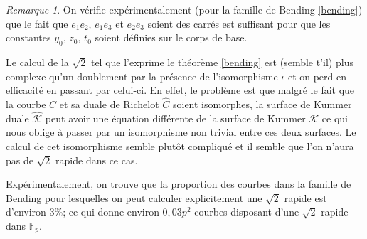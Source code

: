 \documentclass[a4paper,12pt]{article}
\newtheorem{lemme}[theoreme]{Lemme}
\newtheorem{corollaire}[theoreme]{Corollaire}
\theoremstyle{definition}
\theoremstyle{remark}
\newtheorem{remarque}{Remarque}
\numberwithin{equation}{section}
\begin{document}
%
%
%
%
%
\begin{remarque}
On vérifie expérimentalement (pour la famille de Bending \ref{bending}) que le fait que $e_1e_2$, $e_1e_3$ et $e_2e_3$ soient des carrés est suffisant pour que les constantes $y_0$, $z_0$, $t_0$ soient définies sur le corps de base.
\end{remarque}

Le calcul de la $\sqrt{2}$ tel que l'exprime le théorème \ref{bending} est (semble t'il) plus complexe qu'un doublement par la présence de l'isomorphisme $\iota$ et on perd en efficacité en passant par celui-ci.
En effet, le problème est que malgré le fait que la courbe $C$ et sa duale de Richelot $\hat{C}$ soient isomorphes, la surface de Kummer duale $\hat{\mathcal{K}}$ peut avoir une équation différente de la surface de Kummer $\mathcal{K}$ ce qui nous oblige à passer par un isomorphisme non trivial entre ces deux surfaces.
Le calcul de cet isomorphisme semble plutôt compliqué et il semble que l'on n'aura pas de $\sqrt{2}$ rapide dans ce cas.

Expérimentalement, on trouve que la proportion des courbes dans la famille de Bending pour lesquelles on peut calculer explicitement une $\sqrt{2}$ rapide est d'environ 3\%; ce qui donne environ $0,03p^2$ courbes disposant d'une $\sqrt{2}$ rapide dans $\mathbb{F}_p$.
\end{document}

